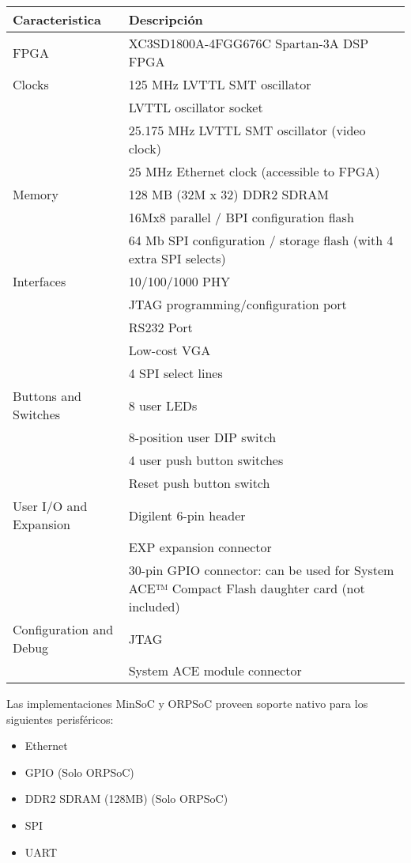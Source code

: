 				\begin{tabular}{ p{4cm} p{10cm} }
				\rowcolor[gray]{0.8} Caracteristica & Descripción \\		
				\hline FPGA   & XC3SD1800A-4FGG676C Spartan-3A DSP FPGA\\
				\hline Clocks & 125 MHz LVTTL SMT oscillator\\
				\hline        & LVTTL oscillator socket\\
				\hline		  & 25.175 MHz LVTTL SMT oscillator (video clock)\\
				\hline		  & 25 MHz Ethernet clock (accessible to FPGA)\\
				\hline Memory & 128 MB (32M x 32) DDR2 SDRAM\\
				\hline		  & 16Mx8 parallel / BPI configuration flash\\
				\hline 		  & 64 Mb SPI configuration / storage flash (with 4 extra SPI selects)\\
				\hline Interfaces & 10/100/1000 PHY\\
				\hline			  & JTAG programming/configuration port\\
				\hline            & RS232 Port\\
				\hline			  & Low-cost VGA\\
				\hline			  & 4 SPI select lines\\
				\hline Buttons and Switches & 8 user LEDs\\
				\hline  		  & 8-position user DIP switch\\
				\hline            & 4 user push button switches\\
				\hline 			  & Reset push button switch\\
				\hline User I/O and Expansion & Digilent 6-pin header\\
				\hline			 			  & EXP expansion connector\\
				\hline 						  & 30-pin GPIO connector: can be used for System ACE™ Compact Flash daughter card (not included)\\
				\hline Configuration and Debug & JTAG\\
				\hline                         & System ACE module connector\\   
				\end{tabular}
				
				Las implementaciones MinSoC y ORPSoC proveen soporte nativo para los siguientes perisféricos:
				\begin{itemize}
				  \item Ethernet
				  \item GPIO (Solo ORPSoC)
				  \item DDR2 SDRAM (128MB) (Solo ORPSoC)
				  \item SPI
				  \item UART				
				\end{itemize}
				
